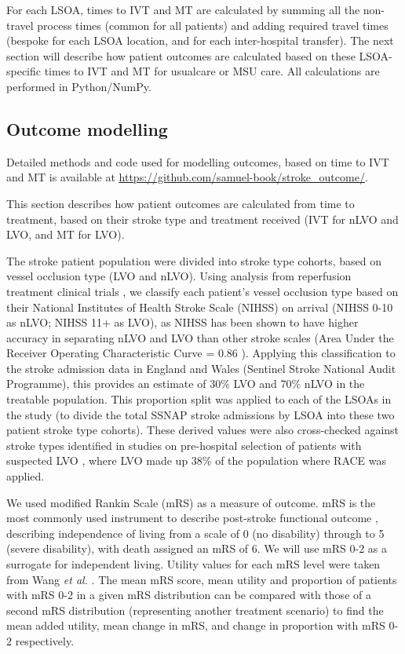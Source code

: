 For each LSOA, times to IVT and MT are calculated by summing all the non-travel process times (common for all patients) and adding required travel times (bespoke for each LSOA location, and for each inter-hospital transfer). The next section will describe how patient outcomes are calculated based on these LSOA-specific times to IVT and MT for usualcare or MSU care. All calculations are performed in Python/NumPy.

\subsection{Outcome modelling}

Detailed methods and code used for modelling outcomes, based on time to IVT and MT is available at \url{https://github.com/samuel-book/stroke_outcome/}.

This section describes how patient outcomes are calculated from time to treatment, based on their stroke type and treatment received (IVT for nLVO and LVO, and MT for LVO).

The stroke patient population were divided into stroke type cohorts, based on vessel occlusion type (LVO and nLVO). Using analysis from reperfusion treatment clinical trials \cite{lees_time_2010, emberson_effect_2014, goyal_endovascular_2016, fransen_time_2016}, we classify each patient's vessel occlusion type based on their National Institutes of Health Stroke Scale (NIHSS) on arrival (NIHSS 0-10 as nLVO; NIHSS 11+ as LVO), as NIHSS has been shown to have higher accuracy in separating nLVO and LVO than other stroke scales (Area Under the Receiver Operating Characteristic Curve = 0.86 \cite{duvekot_comparison_2021}). Applying this classification to the stroke admission data in England and Wales (Sentinel Stroke National Audit Programme), this provides an estimate of 30\% LVO and 70\% nLVO in the treatable population. This proportion split was applied to each of the LSOAs in the study (to divide the total SSNAP stroke admissions by LSOA into these two patient stroke type cohorts). These derived values were also cross-checked against stroke types identified in studies on pre-hospital selection of patients with suspected LVO \cite{de_la_ossa_herrero_design_2013}, where LVO made up 38\% of the population where RACE was applied. 

We used modified Rankin Scale (mRS) as a measure of outcome. mRS is the most commonly used instrument to describe post-stroke functional outcome \cite{quinn_functional_2009}, describing independence of living from a scale of 0 (no disability) through to 5 (severe disability), with death assigned an mRS of 6. We will use mRS 0-2 as a surrogate for independent living. Utility values for each mRS level were taken from Wang \textit{et al.} 
 \cite{wang_utility-weighted_2020}. The mean mRS score, mean utility and proportion of patients with mRS 0-2 in a given mRS distribution can be compared with those of a second mRS distribution (representing another treatment scenario) to find the mean added utility, mean change in mRS, and change in proportion with mRS 0-2 respectively.

